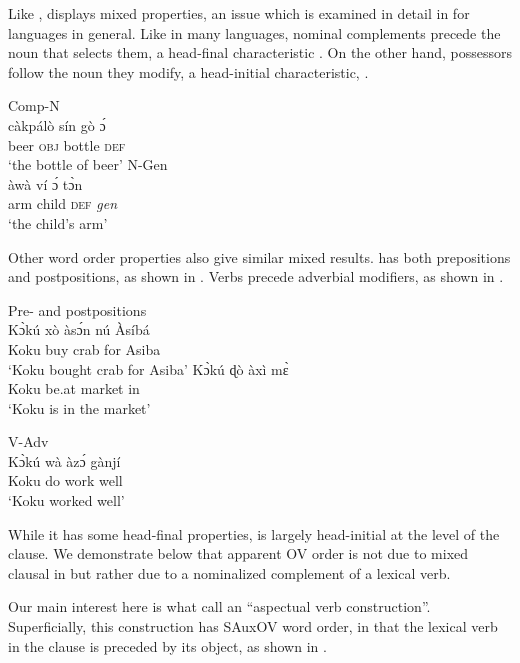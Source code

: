 \documentclass[output=paper,newtxmath,modfonts,nonflat,draftmode]{langsci/langscibook}
\begin{document}
Like ,  displays mixed  properties, an issue which is examined in detail in \citet{aboh04} for  languages in general. Like in many  languages,  nominal complements precede the noun that selects them, a head-final characteristic . On the other hand, possessors follow the noun they modify, a head-initial characteristic, .

\ea
\ea  \label{ex:Fongbe-CompN} {Comp-N}\\
\gll càkpálò sín gò {\'ɔ} \\
beer \textsc{obj} bottle \textsc{def} \\
\glt `the bottle of beer' \hfill \citep[][45]{lefebvre2002}
\ex \label{ex:Fongbe-NGen} {N-Gen}\\
\gll àwà ví {\'ɔ} {t{\`ɔ}n} \\
arm child \textsc{def} \textit{gen} \\
\glt `the child's arm' \hfill \citep[][45]{lefebvre2002}
\z
\z 

Other word order properties also give similar mixed results.  has both prepositions and postpositions, as shown in . Verbs precede adverbial modifiers, as shown in . 

\ea
\ea \label{ex:Fongbe-PP} {Pre- and postpositions}\\
 \gll K{\`ɔ}kú xò às{\'ɔ}n nú  Àsíbá \\
Koku buy crab for Asiba \\
\glt `Koku bought crab for Asiba' \hfill \citep[][302]{lefebvre2002}
\ex \gll K{\`ɔ}kú ɖò àxì m{\`ɛ}\\
Koku be.at market in \\
\glt `Koku is in the market' \hfill \citep[][325]{lefebvre2002}
\z
\z

\ea \label{ex:Fongbe-Adv}
{V-Adv}\\
\gll K{{\`ɔ}kú} wà {àz{\'ɔ}} gànjí \\
Koku do work well \\
\glt `Koku worked well' \hfill \citep[][381]{lefebvre2002}
\z

While it has some head-final properties,  is largely head-initial at the level of the clause. We demonstrate below that apparent OV order is not due to mixed clausal  in  but rather due to a nominalized complement of a lexical verb.

Our main interest here is what \citet{lefebvre2002} call an ``aspectual verb construction''. Superficially, this construction has SAuxOV word order, in that the lexical verb in the clause is preceded by its object, as shown in . 
\end{document}
